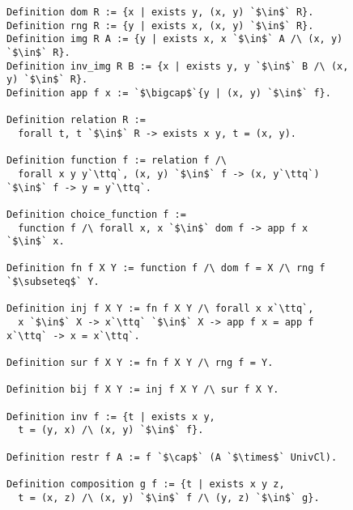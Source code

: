 \begin{figure}
\begin{lstlisting}[language=Coq, xleftmargin=\mathindent, escapechar=`,
caption={Begrifflichkeiten im Bezug auf Relationen und Funktionen}]
Definition dom R := {x | exists y, (x, y) `$\in$` R}.
Definition rng R := {y | exists x, (x, y) `$\in$` R}.
Definition img R A := {y | exists x, x `$\in$` A /\ (x, y) `$\in$` R}.
Definition inv_img R B := {x | exists y, y `$\in$` B /\ (x, y) `$\in$` R}.
Definition app f x := `$\bigcap$`{y | (x, y) `$\in$` f}.

Definition relation R :=
  forall t, t `$\in$` R -> exists x y, t = (x, y).

Definition function f := relation f /\
  forall x y y`\ttq`, (x, y) `$\in$` f -> (x, y`\ttq`) `$\in$` f -> y = y`\ttq`.

Definition choice_function f :=
  function f /\ forall x, x `$\in$` dom f -> app f x `$\in$` x.

Definition fn f X Y := function f /\ dom f = X /\ rng f `$\subseteq$` Y.

Definition inj f X Y := fn f X Y /\ forall x x`\ttq`,
  x `$\in$` X -> x`\ttq` `$\in$` X -> app f x = app f x`\ttq` -> x = x`\ttq`.

Definition sur f X Y := fn f X Y /\ rng f = Y.

Definition bij f X Y := inj f X Y /\ sur f X Y.

Definition inv f := {t | exists x y,
  t = (y, x) /\ (x, y) `$\in$` f}.

Definition restr f A := f `$\cap$` (A `$\times$` UnivCl).

Definition composition g f := {t | exists x y z,
  t = (x, z) /\ (x, y) `$\in$` f /\ (y, z) `$\in$` g}.
\end{lstlisting}
\end{figure}

